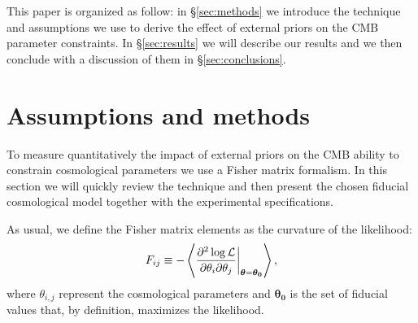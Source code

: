 \documentclass[aps,prd,reprint,superscriptaddress]{revtex4-1}
\newcommand\refsec[1]{\S\ref{sec:#1}}
\begin{document}
This paper is organized as follow: in \refsec{methods} we introduce the technique and assumptions we use to derive the effect of external priors on the CMB parameter constraints. In \refsec{results} we will describe our results and we then conclude with a discussion of them in \refsec{conclusions}.



\section{Assumptions and methods \label{sec:methods}}


To measure quantitatively the impact of external priors on the CMB ability to constrain cosmological parameters we use a Fisher matrix formalism. In this section we will quickly review the technique and then present the chosen fiducial cosmological model together with the experimental specifications.

As usual, we define the Fisher matrix elements as the curvature of the likelihood:
\begin{equation}
	\centering
		F_{ij} \equiv - \left\langle\frac{\partial^2 \log \mathcal{L}}{\partial \theta_i \partial \theta_j} \bigg|_{\boldsymbol{\theta} = \boldsymbol{\theta_0}}\right\rangle,
	\label{eqn:Fij_def}
\end{equation}
where $\theta_{i,j}$ represent the cosmological parameters and $\boldsymbol{\theta_0}$ is the set of fiducial values that, by definition, maximizes the likelihood. 
\end{document}
